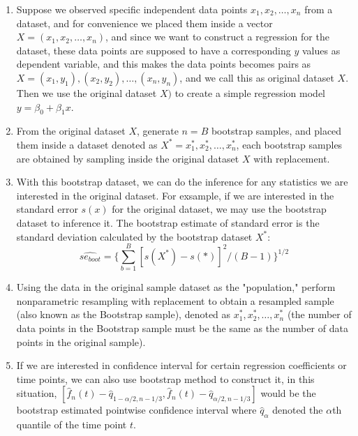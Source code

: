 \documentclass[12pt]{article}
\begin{document}
\begin{enumerate}[label=\arabic*.]
    \item Suppose we observed specific independent data points \(x_1, x_2, \ldots, x_n\) from a dataset, and for convenience we placed them inside a vector \(X = (x_1, x_2, \ldots, x_n)\), and since we want to construct a regression for the dataset, these data points are supposed to have a corresponding \(y\) values as dependent variable, and this makes the data points becomes pairs as \(X = (x_1,y_1) , (x_2,y_2),  \ldots, (x_n,y_n)\), and we call this as original dataset \(X\). Then we use the original dataset \(X)\) to create a simple regression model \(y = \beta_0 + \beta_1 x\).
    \item From the original dataset \(X\), generate \(n = B\) bootstrap samples, and placed them inside a dataset denoted as \(X^* = x_1^*, x_2^*, \ldots, x_n^*\), each bootstrap samples are obtained by sampling inside the original dataset \(X\) with replacement.
    \item With this bootstrap dataset, we can do the inference for any statistics we are interested in the original dataset. For exsample, if we are interested in the standard error \(s(x)\) for the original dataset, we may use the bootstrap dataset to inference it. The bootstrap estimate of standard error is the standard deviation calculated by the bootstrap dataset \(X^*\):
    \begin{equation}
      \hat{se_{boot}} = \{\sum_{b=1}^{B}[s(X^*)-s(*)]^2/(B-1)\}^{1/2}
    \end{equation}

    \item Using the data in the original sample dataset as the "population," perform nonparametric resampling with replacement to obtain a resampled sample (also known as the Bootstrap sample), denoted as \(x_1^*, x_2^*, \ldots, x_n^*\) (the number of data points in the Bootstrap sample must be the same as the number of data points in the original sample).
    \item If we are interested in confidence interval for certain regression coefficients or time points, we can also use bootstrap method to construct it, in this situation, \( [\hat{f}_n(t) - \hat{q}_{1-\alpha/2,n-1/3}, \hat{f}_n(t) - \hat{q}_{\alpha/2,n-1/3} ]\)  would be the bootstrap estimated pointwise confidence interval where \(\hat{q}_\alpha\) denoted the \(\alpha\)th quantile of the time point \(t\).

\end{enumerate}
\end{document}
